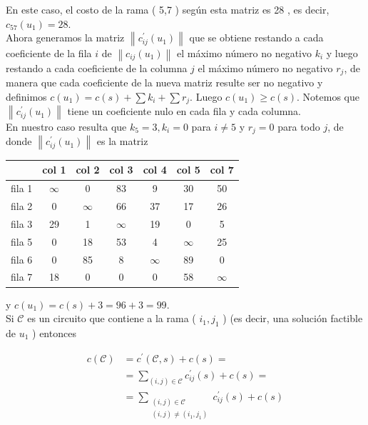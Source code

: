 \documentclass[10pt]{article}
\begin{document}
En este caso, el costo de la rama ( 5,7 ) según esta matriz es 28 , es decir, $c_{57}\left(u_{1}\right)=28$.\\
Ahora generamos la matriz $\left\|c_{i j}^{\prime}\left(u_{1}\right)\right\|$ que se obtiene restando a cada coeficiente de la fila $i$ de $\left\|c_{i j}\left(u_{1}\right)\right\|$ el máximo número no negativo $k_{i}$ y luego restando a cada coeficiente de la columna $j$ el máximo número no negativo $r_{j}$, de manera que cada coeficiente de la nueva matriz resulte ser no negativo y definimos $c\left(u_{1}\right)=c(s)+\sum k_{i}+\sum r_{j}$. Luego $c\left(u_{1}\right) \geq c(s)$. Notemos que $\left\|c_{i j}^{\prime}\left(u_{1}\right)\right\|$ tiene un coeficiente nulo en cada fila y cada columna.\\
En nuestro caso resulta que $k_{5}=3, k_{i}=0$ para $i \neq 5$ y $r_{j}=0$ para todo $j$, de donde $\left\|c_{i j}^{\prime}\left(u_{1}\right)\right\|$ es la matriz

\begin{center}
\begin{tabular}{|c|c|c|c|c|c|c|}
\hline
 & col 1 & col 2 & col 3 & col 4 & col 5 & col 7 \\
\hline
fila 1 & $\infty$ & 0 & 83 & 9 & 30 & 50 \\
\hline
fila 2 & 0 & $\infty$ & 66 & 37 & 17 & 26 \\
\hline
fila 3 & 29 & 1 & $\infty$ & 19 & 0 & 5 \\
\hline
fila 5 & 0 & 18 & 53 & 4 & $\infty$ & 25 \\
\hline
fila 6 & 0 & 85 & 8 & $\infty$ & 89 & 0 \\
\hline
fila 7 & 18 & 0 & 0 & 0 & 58 & $\infty$ \\
\hline
\end{tabular}
\end{center}

y $c\left(u_{1}\right)=c(s)+3=96+3=99$.\\
Si $\mathcal{C}$ es un circuito que contiene a la rama ( $i_{1}, j_{1}$ ) (es decir, una solución factible de $u_{1}$ ) entonces

$$
\begin{aligned}
c(\mathcal{C}) & =c^{\prime}(\mathcal{C}, s)+c(s)= \\
& =\sum_{(i, j) \in \mathcal{C}} c_{i j}^{\prime}(s)+c(s)= \\
& =\sum_{\substack{(i, j) \in \mathcal{C} \\
(i, j) \neq\left(i_{1}, j_{1}\right)}} c_{i j}^{\prime}(s)+c(s)
\end{aligned}
$$
\end{document}
